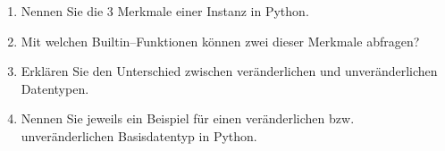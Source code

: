 \begin{enumerate}
	\item Nennen Sie die 3 Merkmale einer Instanz in Python.
	\item Mit welchen Builtin--Funktionen können zwei dieser Merkmale abfragen?
	\item Erklären Sie den Unterschied zwischen veränderlichen und unveränderlichen Datentypen.
	\item Nennen Sie jeweils ein Beispiel für einen veränderlichen bzw. unveränderlichen Basisdatentyp in Python.
\end{enumerate}